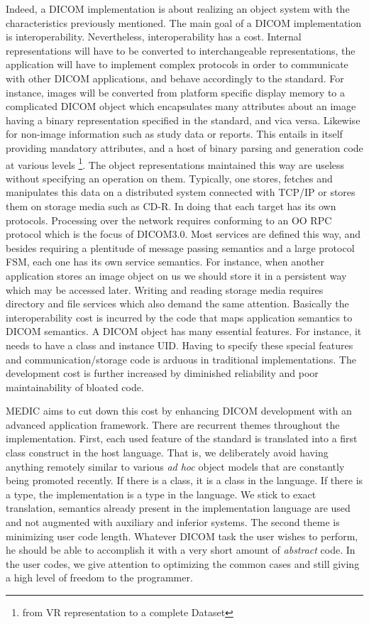 \documentclass[a4paper,10pt]{article}
\begin{document}
Indeed, a DICOM implementation is about realizing an object system
with the characteristics previously mentioned. The main goal of
a DICOM implementation is interoperability. Nevertheless,
interoperability has a cost. Internal representations will have to
be converted to interchangeable representations, the application
will have to implement complex protocols in order to communicate
with other DICOM applications, and behave accordingly to the standard.
For instance, images will be converted from platform specific display
memory to a complicated DICOM object which encapsulates many
attributes about an image having a binary representation
specified in the standard, and vica versa.
Likewise for non-image information such
as study data or reports. This entails in itself providing mandatory
attributes, and a host of binary parsing and generation code at
various levels \footnote{from VR representation to a complete
  Dataset}. The object representations maintained this way are
useless without specifying an operation on them. Typically, one
stores, fetches and manipulates this data on a distributed system
connected with TCP/IP or stores them on storage media such as CD-R.
In doing that each target has its own protocols. Processing over
the network requires conforming to an OO RPC protocol which is the
focus of DICOM3.0. Most services are defined this way, and besides
requiring a plentitude of message passing semantics and a large
protocol FSM, each one has its own service semantics. For instance,
when another application stores an image object on us we should store
it in a persistent way which may be accessed later. Writing and
reading storage media requires directory and file services which also
demand the same attention. Basically the interoperability cost is
incurred by the code that maps application semantics to DICOM
semantics. A DICOM object has many essential features. For instance,
it needs to have a class and instance UID. Having to specify these
special features and communication/storage code is arduous in
traditional implementations. The development cost is further increased
by diminished reliability and poor maintainability of bloated code.

MEDIC aims to cut down this cost by enhancing DICOM development with
an advanced application framework. There are recurrent themes
throughout the implementation. First, each used feature of the
standard is translated into a first class construct in the host
language. That is, we deliberately avoid having anything remotely
similar to various \textit{ad hoc} object models that are constantly
being promoted recently. If there is a class, it is a class in the
language. If there is a type, the implementation is a type in the
language. We stick to exact translation, semantics already present
in the implementation language are used and not augmented with
auxiliary and inferior systems. The second theme is minimizing user
code length. Whatever DICOM task the user wishes to perform, he should
be able to accomplish it with a very short amount of \textit{abstract}
code. In the user codes, we give attention to optimizing the common
cases and still giving a high level of freedom to the programmer.
\end{document}

